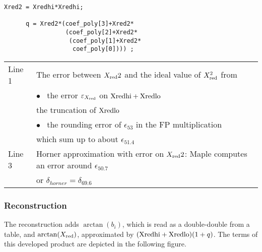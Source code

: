 \begin{lstlisting}[caption={Polynomial Evaluation},firstnumber=1]
      Xred2 = Xredhi*Xredhi;
      
      q = Xred2*(coef_poly[3]+Xred2*
                 (coef_poly[2]+Xred2*
                  (coef_poly[1]+Xred2*
                   coef_poly[0]))) ;

\end{lstlisting}
\begin{tabular}{ll}
Line 1 & The error between $X_{\mathrm{red}}2$ and the ideal value of $X_{\mathrm{red}}^2$ from\\
       & $\bullet$~ the error $\varepsilon_{X_{\mathrm{red}}}$  on ${\mathrm{Xredhi}}+{\mathrm{Xredlo}}$\\
       & the truncation of ${\mathrm{Xredlo}}$\\
       & $\bullet$~ the rounding error of $\epsilon_{53}$ 
                     in the FP multiplication\\
       & which sum up to about $\epsilon_{51.4}$ \\
Line 3 & Horner approximation with error on $X_{\mathrm{red}}2$:
      Maple computes an error around $\epsilon_{50.7}$\\
      & or $\delta_{horner}=\delta_{69.6}$\\ 
\end{tabular}

\subsubsection{Reconstruction}

The reconstruction adds $\arctan(b_i)$, 
which is read as a double-double from a table, and $\arctan(X_{\mathrm{red}})$, 
approximated by  $({\mathrm{Xredhi}}+{\mathrm{Xredlo}})(1+q)$. 
The terms of this developed product are depicted in the following figure. 


\begin{center}
 \small
 \setlength{\unitlength}{3ex}
  \end{center}

